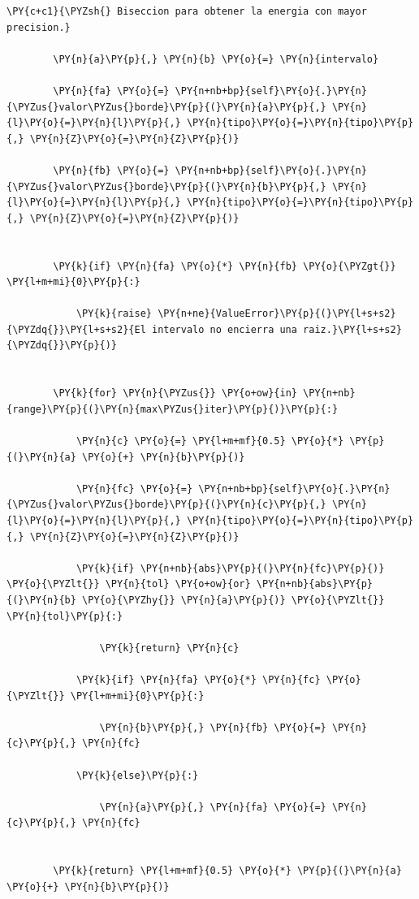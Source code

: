 \documentclass[11pt]{article}
\makeatletter
\def\PY@reset{\let\PY@it=\relax \let\PY@bf=\relax \let\PY@ul=\relax \let\PY@tc=\relax \let\PY@bc=\relax \let\PY@ff=\relax}
\def\PY@tok#1{\csname PY@tok@#1\endcsname}
\def\PY@toks#1+{\ifx\relax#1\empty\else \PY@tok{#1}\expandafter\PY@toks\fi}
\def\PY@do#1{\PY@bc{\PY@tc{\PY@ul{\PY@it{\PY@bf{\PY@ff{#1}}}}}}}
\def\PY#1#2{\PY@reset\PY@toks#1+\relax+\PY@do{#2}}
\makeatother
\begin{document}
\begin{tcolorbox}[breakable, size=fbox, boxrule=1pt, pad at break*=1mm,colback=cellbackground, colframe=cellborder]
\begin{Verbatim}[commandchars=\\\{\}]
        \PY{c+c1}{\PYZsh{} Biseccion para obtener la energia con mayor precision.}

        \PY{n}{a}\PY{p}{,} \PY{n}{b} \PY{o}{=} \PY{n}{intervalo}

        \PY{n}{fa} \PY{o}{=} \PY{n+nb+bp}{self}\PY{o}{.}\PY{n}{\PYZus{}valor\PYZus{}borde}\PY{p}{(}\PY{n}{a}\PY{p}{,} \PY{n}{l}\PY{o}{=}\PY{n}{l}\PY{p}{,} \PY{n}{tipo}\PY{o}{=}\PY{n}{tipo}\PY{p}{,} \PY{n}{Z}\PY{o}{=}\PY{n}{Z}\PY{p}{)}

        \PY{n}{fb} \PY{o}{=} \PY{n+nb+bp}{self}\PY{o}{.}\PY{n}{\PYZus{}valor\PYZus{}borde}\PY{p}{(}\PY{n}{b}\PY{p}{,} \PY{n}{l}\PY{o}{=}\PY{n}{l}\PY{p}{,} \PY{n}{tipo}\PY{o}{=}\PY{n}{tipo}\PY{p}{,} \PY{n}{Z}\PY{o}{=}\PY{n}{Z}\PY{p}{)}


        \PY{k}{if} \PY{n}{fa} \PY{o}{*} \PY{n}{fb} \PY{o}{\PYZgt{}} \PY{l+m+mi}{0}\PY{p}{:}

            \PY{k}{raise} \PY{n+ne}{ValueError}\PY{p}{(}\PY{l+s+s2}{\PYZdq{}}\PY{l+s+s2}{El intervalo no encierra una raiz.}\PY{l+s+s2}{\PYZdq{}}\PY{p}{)}


        \PY{k}{for} \PY{n}{\PYZus{}} \PY{o+ow}{in} \PY{n+nb}{range}\PY{p}{(}\PY{n}{max\PYZus{}iter}\PY{p}{)}\PY{p}{:}

            \PY{n}{c} \PY{o}{=} \PY{l+m+mf}{0.5} \PY{o}{*} \PY{p}{(}\PY{n}{a} \PY{o}{+} \PY{n}{b}\PY{p}{)}

            \PY{n}{fc} \PY{o}{=} \PY{n+nb+bp}{self}\PY{o}{.}\PY{n}{\PYZus{}valor\PYZus{}borde}\PY{p}{(}\PY{n}{c}\PY{p}{,} \PY{n}{l}\PY{o}{=}\PY{n}{l}\PY{p}{,} \PY{n}{tipo}\PY{o}{=}\PY{n}{tipo}\PY{p}{,} \PY{n}{Z}\PY{o}{=}\PY{n}{Z}\PY{p}{)}

            \PY{k}{if} \PY{n+nb}{abs}\PY{p}{(}\PY{n}{fc}\PY{p}{)} \PY{o}{\PYZlt{}} \PY{n}{tol} \PY{o+ow}{or} \PY{n+nb}{abs}\PY{p}{(}\PY{n}{b} \PY{o}{\PYZhy{}} \PY{n}{a}\PY{p}{)} \PY{o}{\PYZlt{}} \PY{n}{tol}\PY{p}{:}

                \PY{k}{return} \PY{n}{c}

            \PY{k}{if} \PY{n}{fa} \PY{o}{*} \PY{n}{fc} \PY{o}{\PYZlt{}} \PY{l+m+mi}{0}\PY{p}{:}

                \PY{n}{b}\PY{p}{,} \PY{n}{fb} \PY{o}{=} \PY{n}{c}\PY{p}{,} \PY{n}{fc}

            \PY{k}{else}\PY{p}{:}

                \PY{n}{a}\PY{p}{,} \PY{n}{fa} \PY{o}{=} \PY{n}{c}\PY{p}{,} \PY{n}{fc}


        \PY{k}{return} \PY{l+m+mf}{0.5} \PY{o}{*} \PY{p}{(}\PY{n}{a} \PY{o}{+} \PY{n}{b}\PY{p}{)}



\end{Verbatim}
\end{tcolorbox}
\end{document}
